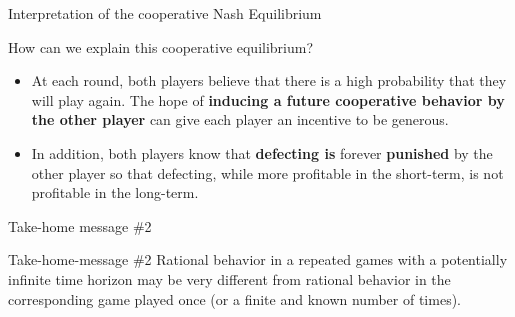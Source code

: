
\begin{frame}{Interpretation of the cooperative Nash Equilibrium}
    \begin{exampleblock}{How can we explain this cooperative equilibrium?}
        \begin{itemize}
            \item At each round, both players believe that there is a high probability that they
            will play again. The hope of \textbf{inducing a future cooperative behavior by the other
            player} can give each player an incentive to be generous.
            \item In addition, both players know that \textbf{defecting is} forever \textbf{punished} by
            the other player so that defecting, while more profitable in the short-term, is not profitable
            in the long-term.
        \end{itemize}
    \end{exampleblock}
\end{frame}

\begin{frame}{Take-home message \#2}
    \begin{block}{Take-home-message \#2}
        Rational behavior in a repeated games with a potentially infinite time horizon may be
        very different from rational behavior in the corresponding game played once (or a finite
        and known number of times).
    \end{block}
\end{frame}
